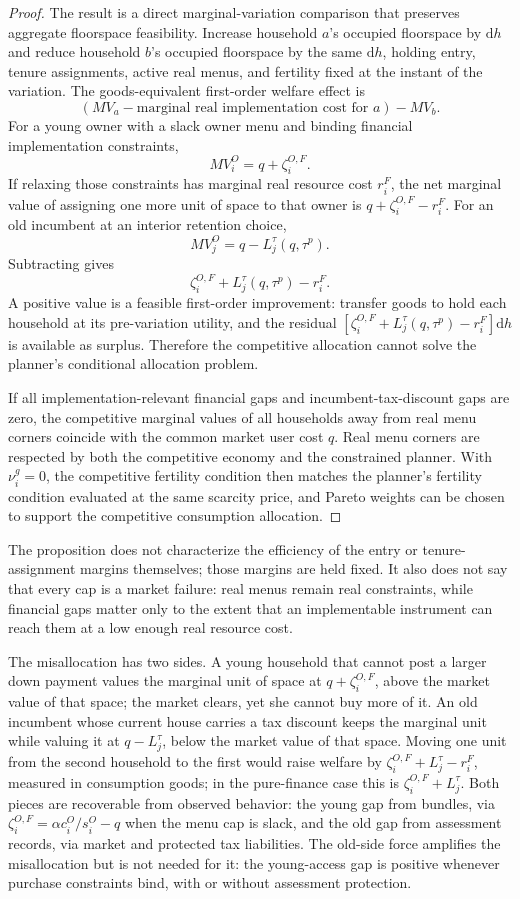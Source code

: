 \documentclass[11pt]{article}
\newcommand{\dd}{\mathrm d}
\newcommand{\1}{\mathbf 1}
\begin{document}
\begin{proof}
The result is a direct marginal-variation comparison that preserves aggregate floorspace feasibility. Increase household $a$'s occupied floorspace by $\dd h$ and reduce household $b$'s occupied floorspace by the same $\dd h$, holding entry, tenure assignments, active real menus, and fertility fixed at the instant of the variation. The goods-equivalent first-order welfare effect is
\[
\left(MV_a-\text{marginal real implementation cost for }a\right)-MV_b.
\]
For a young owner with a slack owner menu and binding financial implementation constraints,
\[
MV_i^O=q+\zeta_i^{O,F}.
\]
If relaxing those constraints has marginal real resource cost $r_i^F$, the net marginal value of assigning one more unit of space to that owner is $q+\zeta_i^{O,F}-r_i^F$. For an old incumbent at an interior retention choice,
\[
MV_j^O=q-L_j^\tau(q,\tau^p).
\]
Subtracting gives
\[
\zeta_i^{O,F}+L_j^\tau(q,\tau^p)-r_i^F.
\]
A positive value is a feasible first-order improvement: transfer goods to hold each household at its pre-variation utility, and the residual $\left[\zeta_i^{O,F}+L_j^\tau(q,\tau^p)-r_i^F\right]\dd h$ is available as surplus. Therefore the competitive allocation cannot solve the planner's conditional allocation problem.

If all implementation-relevant financial gaps and incumbent-tax-discount gaps are zero, the competitive marginal values of all households away from real menu corners coincide with the common market user cost $q$. Real menu corners are respected by both the competitive economy and the constrained planner. With $\nu_i^g=0$, the competitive fertility condition then matches the planner's fertility condition evaluated at the same scarcity price, and Pareto weights can be chosen to support the competitive consumption allocation.
\end{proof}

The proposition does not characterize the efficiency of the entry or tenure-assignment margins themselves; those margins are held fixed. It also does not say that every cap is a market failure: real menus remain real constraints, while financial gaps matter only to the extent that an implementable instrument can reach them at a low enough real resource cost.

The misallocation has two sides. A young household that cannot post a larger down payment values the marginal unit of space at $q+\zeta_i^{O,F}$, above the market value of that space; the market clears, yet she cannot buy more of it. An old incumbent whose current house carries a tax discount keeps the marginal unit while valuing it at $q-L_j^\tau$, below the market value of that space. Moving one unit from the second household to the first would raise welfare by $\zeta_i^{O,F}+L_j^\tau-r_i^F$, measured in consumption goods; in the pure-finance case this is $\zeta_i^{O,F}+L_j^\tau$. Both pieces are recoverable from observed behavior: the young gap from bundles, via $\zeta_i^{O,F}=\alpha c_i^O/s_i^O-q$ when the menu cap is slack, and the old gap from assessment records, via market and protected tax liabilities. The old-side force amplifies the misallocation but is not needed for it: the young-access gap is positive whenever purchase constraints bind, with or without assessment protection.
\end{document}

